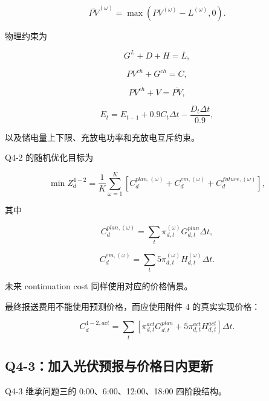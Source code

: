 \[
\overline{PV}^{(\omega)}
=
\max(PV^{(\omega)}-L^{(\omega)},0).
\]

物理约束为

\begin{equation}
G^L+D+H=\overline L,
\end{equation}

\begin{equation}
PV^{ch}+G^{ch}=C,
\end{equation}

\begin{equation}
PV^{ch}+V=\overline{PV},
\end{equation}

\begin{equation}
E_t
=
E_{t-1}
+
0.9C_t\Delta t
-
\frac{D_t\Delta t}{0.9},
\end{equation}

以及储电量上下限、充放电功率和充放电互斥约束。

Q4-2 的随机优化目标为

\begin{equation}
\min Z_d^{4-2}
=
\frac1K
\sum_{\omega=1}^{K}
\left[
C_d^{plan,(\omega)}
+
C_d^{em,(\omega)}
+
C_d^{future,(\omega)}
\right],
\end{equation}

其中

\begin{equation}
C_d^{plan,(\omega)}
=
\sum_t
\pi_{d,t}^{(\omega)}
G_{d,t}^{plan}
\Delta t,
\end{equation}

\begin{equation}
C_d^{em,(\omega)}
=
\sum_t
5\pi_{d,t}^{(\omega)}
H_{d,t}^{(\omega)}
\Delta t.
\end{equation}

未来 continuation cost 同样使用对应的价格情景。

最终报送费用不能使用预测价格，而应使用附件 4 的真实实现价格：

\begin{equation}
C_d^{4-2,act}
=
\sum_t
\left[
\pi_{d,t}^{act}G_{d,t}^{plan}
+
5\pi_{d,t}^{act}H_{d,t}^{act}
\right]\Delta t.
\end{equation}

\subsection{Q4-3：加入光伏预报与价格日内更新}

Q4-3 继承问题三的 0:00、6:00、12:00、18:00 四阶段结构。

